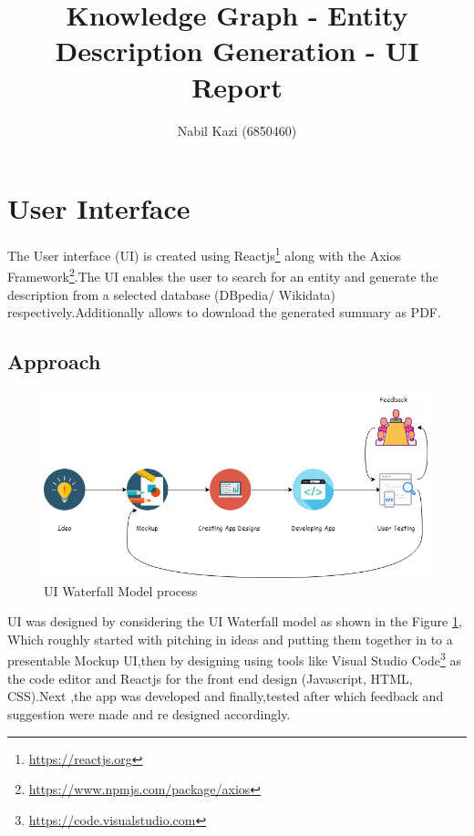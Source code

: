 \documentclass[head,11pt]{llncs}
\begin{document}
%
\title{Knowledge Graph - Entity Description Generation - UI Report}
%
%
\author{Nabil Kazi (6850460)}
%
%
%
\maketitle              %
%
\section{User Interface}
\label{sec:intro}
The User interface (UI) is created using Reactjs\footnote{\url{https://reactjs.org}} along with the Axios Framework\footnote{\url{https://www.npmjs.com/package/axios}}.The UI enables the user to search for an entity and generate the description from a selected database (DBpedia/ Wikidata) respectively.Additionally allows to download the generated summary as PDF.




\subsection{Approach}
\begin{figure}
\includegraphics[width=120mm]{figures/ui process.png}
\caption{UI Waterfall Model process}
\label{ui process}
\end{figure}

UI was designed by considering the UI Waterfall model as shown in the Figure \ref{ui process}, Which roughly started with pitching in ideas and putting them together in to a presentable Mockup UI,then by designing using tools like Visual Studio Code\footnote{\url{https://code.visualstudio.com}} as the code editor and Reactjs for the front end design (Javascript, HTML, CSS).Next ,the app was developed and finally,tested after which feedback and suggestion were made and re designed accordingly.
\end{document}
